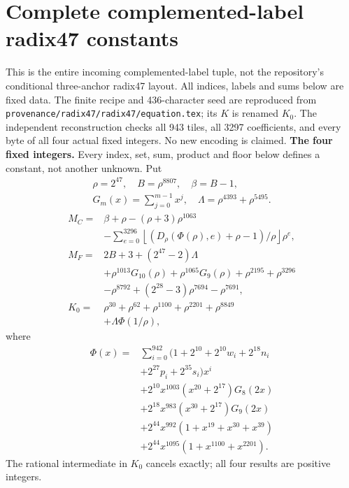 \section{Complete complemented-label radix47 constants}
\label{sec:compact47constants}
This is the entire incoming complemented-label tuple, not the repository's
conditional three-anchor radix47 layout. All indices, labels and sums below
are fixed data. The finite recipe and 436-character seed are reproduced from
\texttt{provenance/radix47/radix47/equation.tex}; its $K$ is renamed $K_0$.
The independent reconstruction checks all 943 tiles, all 3297 coefficients,
and every byte of all four actual fixed integers. No new encoding is claimed.
\begingroup
\providecommand{\fl}[1]{\left\lfloor#1\right\rfloor}
\providecommand{\rg}[2]{\{#1,\ldots,#2\}}
\textbf{The four fixed integers.}
Every index, set, sum, product and floor below defines a constant, not
another unknown. Put
\[
\begin{gathered}
\rho=2^{47},\quad B=\rho^{8807},\quad\beta=B-1,\\
G_m(x)=\sum_{j=0}^{m-1}x^j,\quad
\Lambda=\rho^{4393}+\rho^{5495}.
\end{gathered}
\]
\begin{align*}
M_C={}&\beta+\rho-(\rho+3)\rho^{1063}\\
&-\sum_{e=0}^{3296}\fl{(D_\rho(\Phi(\rho),e)+\rho-1)/\rho}\rho^e,\\
M_F={}&2B+3+(2^{47}-2)\Lambda\\
&+\rho^{1013}G_{10}(\rho)+\rho^{1065}G_9(\rho)
  +\rho^{2195}+\rho^{3296}\\
&-\rho^{8792}+(2^{28}-3)\rho^{7694}-\rho^{7691},\\
K_0={}&\rho^{30}+\rho^{62}+\rho^{1100}+\rho^{2201}+\rho^{8849}\\
&+\Lambda\Phi(1/\rho),
\end{align*}
where
\[
\begin{split}
\Phi(x)={}&\sum_{i=0}^{942}(1+2^{10}+2^{10}w_i+2^{18}n_i\\
&+2^{27}p_i+2^{35}s_i)x^i\\
&+2^{10}x^{1003}(x^{20}+2^{17})G_8(2x)\\
&+2^{18}x^{983}(x^{30}+2^{17})G_9(2x)\\
&+2^{44}x^{992}(1+x^{19}+x^{30}+x^{39})\\
&+2^{44}x^{1095}(1+x^{1100}+x^{2201}).
\end{split}
\]
The rational intermediate in $K_0$ cancels exactly; all four results are positive integers.

